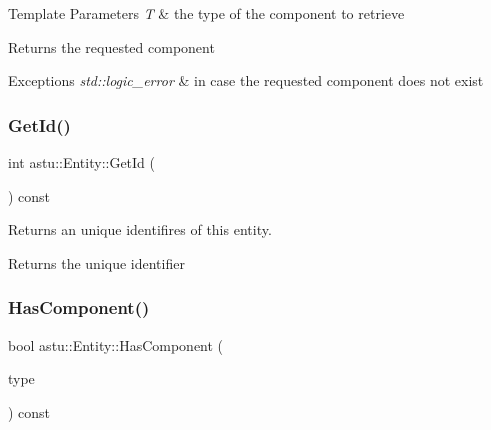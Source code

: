 \begin{DoxyTemplParams}{Template Parameters}
{\em T} & the type of the component to retrieve \\
\hline
\end{DoxyTemplParams}
\begin{DoxyReturn}{Returns}
the requested component 
\end{DoxyReturn}

\begin{DoxyExceptions}{Exceptions}
{\em std\+::logic\+\_\+error} & in case the requested component does not exist \\
\hline
\end{DoxyExceptions}
\mbox{\label{classastu_1_1Entity_ab64fa42f507c05701afa182f1c08dc1d}} 
\subsubsection{\texorpdfstring{Get\+Id()}{GetId()}}
{\footnotesize\ttfamily int astu\+::\+Entity\+::\+Get\+Id (\begin{DoxyParamCaption}{ }\end{DoxyParamCaption}) const\hspace{0.3cm}{\ttfamily [inline]}}

Returns an unique identifires of this entity.

\begin{DoxyReturn}{Returns}
the unique identifier 
\end{DoxyReturn}
\mbox{\label{classastu_1_1Entity_ad1ee4a4e617de7c40eb252413b9045a1}} 
\subsubsection{\texorpdfstring{Has\+Component()}{HasComponent()}\hspace{0.1cm}{\footnotesize\ttfamily [1/2]}}
{\footnotesize\ttfamily bool astu\+::\+Entity\+::\+Has\+Component (\begin{DoxyParamCaption}\item[{const std\+::type\+\_\+index \&}]{type }\end{DoxyParamCaption}) const}

